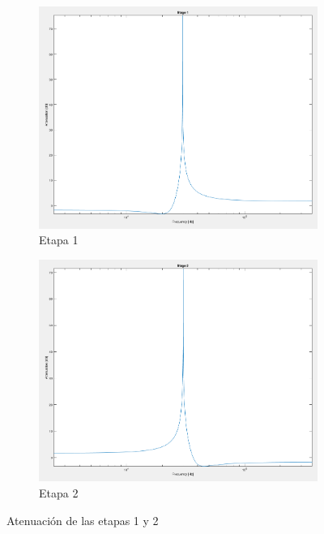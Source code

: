 \begin{figure}[ht]
    \begin{subfigure}{.5\textwidth}
      \centering
      \includegraphics[width=.8\linewidth]{../Ex4/Resources/ej4_teorico_e1.png}  
      \caption{Etapa 1}
      \label{fig:ej4_bode_teorico_e1}
    \end{subfigure}
    \begin{subfigure}{.5\textwidth}
      \centering
      \includegraphics[width=.8\linewidth]{../Ex4/Resources/ej4_teorico_e2.png}  
      \caption{Etapa 2}
      \label{fig:sub-second}
    \end{subfigure}
    \caption{Atenuación de las etapas 1 y 2}
    \label{fig:ej4_bode_teorico_e2}
    \end{figure}



